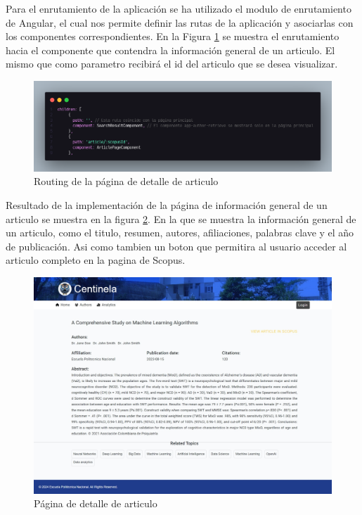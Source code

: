 Para el enrutamiento de la aplicación se ha utilizado el modulo de enrutamiento de Angular, el cual nos permite definir las rutas de la aplicación y asociarlas con los componentes correspondientes.
En la Figura \ref{fig:enrutamiento-article-page} se muestra el enrutamiento hacia el componente que contendra la información general de un articulo. El mismo que como parametro recibirá el id del articulo que se desea visualizar.
\begin{figure}[H]
    \centering
    \includegraphics[scale=0.2]{../02Figures/02Chapter/Sprints/Sprint-1/enrutamiento-article-page.png}
    \caption{Routing de la página de detalle de articulo}
    \label{fig:enrutamiento-article-page}
\end{figure}

Resultado de la implementación de la página de información general de un articulo se muestra en la figura \ref{fig:article-page}.
En la que se muestra la información general de un articulo, como el titulo, resumen, autores, afiliaciones, palabras clave y el año de publicación. Asi como tambien un boton que permitira al usuario acceder al articulo completo en la pagina de Scopus.

\begin{figure}[H]
    \centering
    \includegraphics[scale=0.160]{../02Figures/02Chapter/Sprints/Sprint-1/article-page.jpeg}
    \caption{Página de detalle de articulo}
    \label{fig:article-page}
\end{figure}

